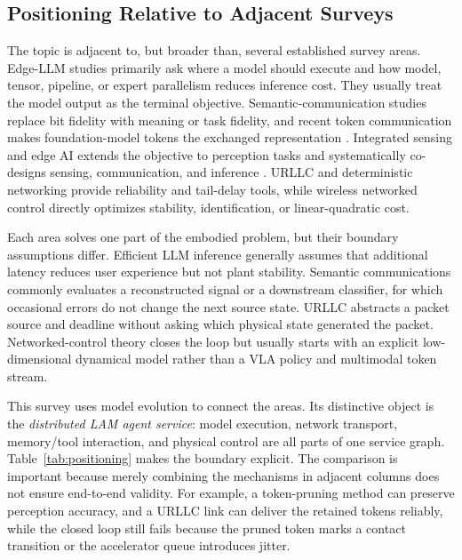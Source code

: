 \documentclass[letterpaper,journal]{IEEEtran}
\begin{document}
\subsection{Positioning Relative to Adjacent Surveys}
The topic is adjacent to, but broader than, several established survey areas.
Edge-LLM studies primarily ask where a model should execute and how model,
tensor, pipeline, or expert parallelism reduces inference cost. They usually
treat the model output as the terminal objective. Semantic-communication
studies replace bit fidelity with meaning or task fidelity, and recent token
communication makes foundation-model tokens the exchanged representation
\cite{semanticclassic,tokcom}. Integrated sensing and edge AI extends the
objective to perception tasks and systematically co-designs sensing,
communication, and inference \cite{isea}. URLLC and deterministic networking
provide reliability and tail-delay tools, while wireless networked control
directly optimizes stability, identification, or linear-quadratic cost.

Each area solves one part of the embodied problem, but their boundary
assumptions differ. Efficient LLM inference generally assumes that additional
latency reduces user experience but not plant stability. Semantic
communications commonly evaluates a reconstructed signal or a downstream
classifier, for which occasional errors do not change the next source state.
URLLC abstracts a packet source and deadline without asking which physical
state generated the packet. Networked-control theory closes the loop but
usually starts with an explicit low-dimensional dynamical model rather than a
VLA policy and multimodal token stream.

This survey uses model evolution to connect the areas. Its distinctive object
is the \emph{distributed LAM agent service}: model execution, network
transport, memory/tool interaction, and physical control are all parts of one
service graph. Table~\ref{tab:positioning} makes the boundary explicit. The
comparison is important because merely combining the mechanisms in adjacent
columns does not ensure end-to-end validity. For example, a token-pruning
method can preserve perception accuracy, and a URLLC link can deliver the
retained tokens reliably, while the closed loop still fails because the
pruned token marks a contact transition or the accelerator queue introduces
jitter.
\end{document}
